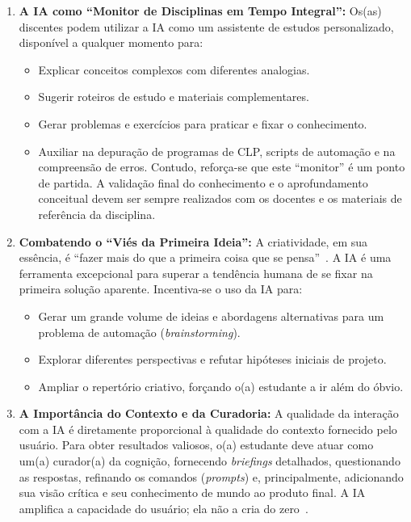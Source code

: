 \begin{enumerate}
    \item \textbf{A IA como ``Monitor de Disciplinas em Tempo Integral'':} Os(as) discentes podem utilizar a IA como um assistente de estudos personalizado, disponível a qualquer momento para:
    \begin{itemize}
        \item Explicar conceitos complexos com diferentes analogias.

        \item Sugerir roteiros de estudo e materiais complementares.

        \item Gerar problemas e exercícios para praticar e fixar o conhecimento.

        \item Auxiliar na depuração de programas de CLP, scripts de automação e na compreensão de erros.
        Contudo, reforça-se que este ``monitor'' é um ponto de partida. A validação final do conhecimento e o aprofundamento conceitual devem ser sempre realizados com os docentes e os materiais de referência da disciplina.
    \end{itemize}

    \item \textbf{Combatendo o ``Viés da Primeira Ideia'':} A criatividade, em sua essência, é ``fazer mais do que a primeira coisa que se pensa''~\cite{utley_2025}. A IA é uma ferramenta excepcional para superar a tendência humana de se fixar na primeira solução aparente. Incentiva-se o uso da IA para:
    \begin{itemize}
        \item Gerar um grande volume de ideias e abordagens alternativas para um problema de automação (\textit{brainstorming}).

        \item Explorar diferentes perspectivas e refutar hipóteses iniciais de projeto.

        \item Ampliar o repertório criativo, forçando o(a) estudante a ir além do óbvio.
    \end{itemize}

    \item \textbf{A Importância do Contexto e da Curadoria:} A qualidade da interação com a IA é diretamente proporcional à qualidade do contexto fornecido pelo usuário. Para obter resultados valiosos, o(a) estudante deve atuar como um(a) curador(a) da cognição, fornecendo \textit{briefings} detalhados, questionando as respostas, refinando os comandos (\textit{prompts}) e, principalmente, adicionando sua visão crítica e seu conhecimento de mundo ao produto final. A IA amplifica a capacidade do usuário; ela não a cria do zero~\cite{utley_2025}.
\end{enumerate}

